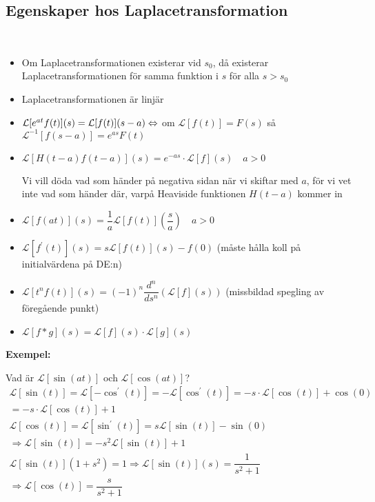 \subsection{Egenskaper hos Laplacetransformation}\hfill\\\par
\begin{itemize}
  \item Om Laplacetransformationen existerar vid $s_0$, då existerar Laplacetransformationen för samma funktion i $s$ för alla $s>s_0$
    \par\bigskip
  \item Laplacetransformationen är linjär
    \par\bigskip
  \item $\mathcal{L}[e^{at}f(t)](s) = \mathcal{L}[f(t)](s-a)\Leftrightarrow$ om $\mathcal{L}[f(t)] = F(s)$ så $\mathcal{L}^{-1}[f(s-a)] = e^{as}F(t)$ 
    \par\bigskip
  \item $\mathcal{L}[H(t-a)f(t-a)](s) = e^{-as}\cdot\mathcal{L}[f](s)\quad a>0$\par
    \noindent Vi vill döda vad som händer på negativa sidan när vi skiftar med $a$, för vi vet inte vad som händer där, varpå Heaviside funktionen $H(t-a)$ kommer in
    \par\bigskip
  \item $\mathcal{L}[f(at)](s) = \dfrac{1}{a}\mathcal{L}[f(t)]\left(\dfrac{s}{a}\right)\quad a>0$
    \par\bigskip
  \item $\mathcal{L}[f^{\prime}(t)](s) = s\mathcal{L}[f(t)](s)-f(0)$ (måste hålla koll på initialvärdena på DE:n)
    \par\bigskip
  \item $\mathcal{L}[t^nf(t)](s) = (-1)^n\dfrac{d^n}{ds^n}\left(\mathcal{L}[f](s)\right)$ (missbildad spegling av föregående punkt)
    \par\bigskip
  \item $\mathcal{L}[f*g](s) = \mathcal{L}[f](s)\cdot\mathcal{L}[g](s)$
\end{itemize}
\par\bigskip
\noindent\textbf{Exempel:}\par
\noindent Vad är $\mathcal{L}[\sin(at)]$ och $\mathcal{L}[\cos(at)]$?
\begin{equation*}
  \begin{gathered}
    \mathcal{L}[\sin(t)] = \mathcal{L}[-\cos^{\prime}(t)] = -\mathcal{L}[\cos^{\prime}(t)] = -s\cdot\mathcal{L}[\cos(t)]+\cos(0)\\
    = -s\cdot\mathcal{L}[\cos(t)]+1\\
    \mathcal{L}[\cos(t)] = \mathcal{L}[\sin^{\prime}(t)]=s\mathcal{L}[\sin(t)] - \sin(0)\\
    \Rightarrow \mathcal{L}[\sin(t)] = -s^2\mathcal{L}[\sin(t)]+1\\
    \mathcal{L}[\sin(t)](1+s^2) = 1\Rightarrow \mathcal{L}[\sin(t)](s) = \dfrac{1}{s^2+1}\\
    \Rightarrow\mathcal{L}[\cos(t)] = \dfrac{s}{s^2+1}
  \end{gathered}
\end{equation*}
